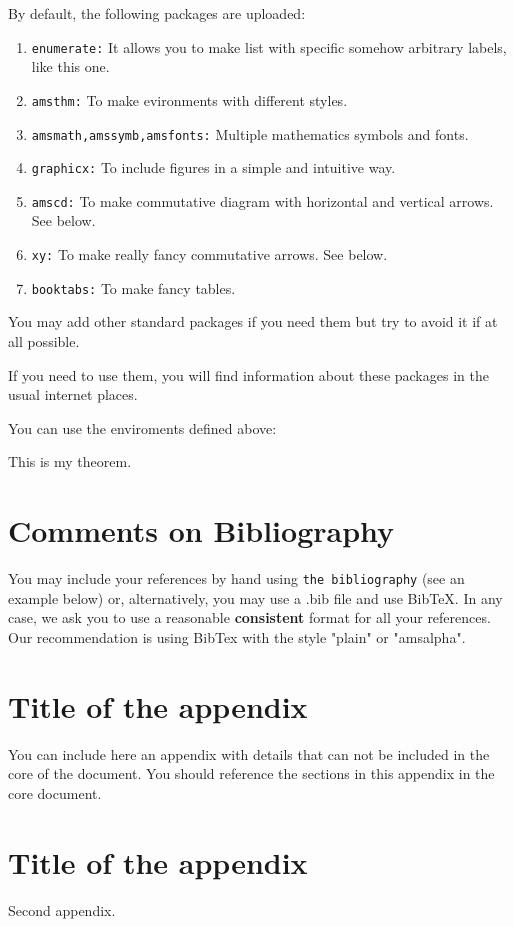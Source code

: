 \documentclass[12,twoside]{TFG-GCED}
\begin{document}
By default, the following packages are uploaded:
\begin{enumerate}[\bf (1)]
\item {\tt enumerate:} It allows you to make list with specific somehow arbitrary labels, like this one.
\item {\tt amsthm:} To make evironments with different styles.
\item {\tt amsmath,amssymb,amsfonts:} Multiple mathematics symbols and fonts.
\item {\tt graphicx:} To include figures in a simple and intuitive way.
\item {\tt amscd:} To make commutative diagram with horizontal and vertical arrows. See below.
\item {\tt xy:} To make really fancy commutative arrows. See below.
\item {\tt booktabs:} To make fancy tables.
\end{enumerate}
You may add other standard packages if you need them but try to avoid it if at all possible.

If you need to use them, you will find information about these packages in the usual internet places.

You can use the enviroments defined above:
\begin{theorem} This is my theorem.
\end{theorem}

\section*{Comments on Bibliography}

You may include\cite{ex} your references by hand using {\tt the bibliography} (see an example below) or, alternatively, you may use a .bib file and use BibTeX. In any case, we ask \cite{Mueller2002TransferFunctionMW, ex}you to use a reasonable {\bf consistent} format for all your references. Our recommendation is using BibTex with the style   "plain" or "amsalpha".





\appendix
\vfill\newpage \section{Title of the appendix}
You can include here an appendix with details that can not be included in the core of the document. You should reference the sections in this appendix in the core document.
\vfill\newpage \section{Title of the appendix}
Second appendix.
\end{document}
